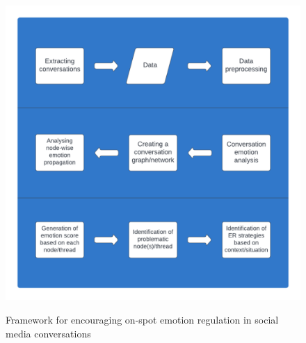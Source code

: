 \begin{figure}[h]
  
    \centering
    \includegraphics[width=12cm,height=12cm,keepaspectratio]{framework.pdf}
  \caption{Framework for encouraging on-spot emotion regulation in social media conversations}
  \label{fig:Framework}
  \end{figure}  


 

